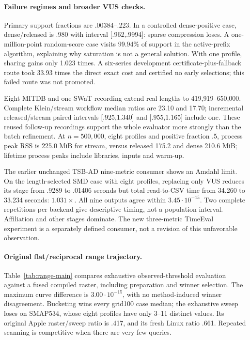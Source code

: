 \paragraph{Failure regimes and broader VUS checks.}
Primary support fractions are .00384--.223. In a controlled dense-positive
case, dense/released is .980 with interval [.962,.9994]: sparse compression
loses. A one-million-point random-score case visits 99.94\% of support in the
active-prefix algorithm, explaining why saturation is not a general solution.
With one profile, sharing gains only 1.023 times. A six-series development
certificate-plus-fallback route took 33.93 times the direct exact cost and
certified no early selections; this failed route was not promoted.

Eight MITDB and one SWaT recording extend real lengths to 419,919--650,000.
Complete Klein/stream workflow median ratios are 23.10 and 17.70; incremental
released/stream paired intervals [.925,1.340] and [.955,1.165] include one.
These reused follow-up recordings support the whole evaluator more strongly
than the batch refinement. At $n=500{,}000$, eight profiles and positive fraction
.5, process peak RSS is 225.0 MiB for stream, versus released 175.2 and dense
210.6 MiB; lifetime process peaks include libraries, inputs and warm-up.

The earlier unchanged TSB-AD nine-metric consumer shows an Amdahl limit. On
the length-selected SMD case with eight profiles, replacing only VUS reduces
its stage from .9289 to .01406 seconds but total read-to-CSV time from 34.260
to 33.234 seconds: $1.031\times$. All nine outputs agree within
$3.45\cdot10^{-15}$. Two complete repetitions per backend give descriptive
timing, not a population interval. Affiliation and other stages dominate.
The new three-metric TimeEval experiment is a separately defined consumer,
not a revision of this unfavorable observation.

\paragraph{Original flat/reciprocal range trajectory.}
Table~\ref{tab:range-main} compares exhaustive observed-threshold evaluation
against a fused compiled raster, including preparation and winner selection.
The maximum curve difference is $3.00\cdot10^{-15}$, with no method-induced
winner disagreement. Bucketing wins every grid100 case median; the exhaustive
sweep loses on SMAP534, whose eight profiles have only 3--11 distinct values.
Its original Apple raster/sweep ratio is .417, and its fresh Linux ratio .661.
Repeated scanning is competitive when there are very few queries.

